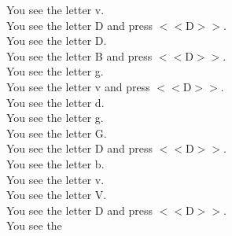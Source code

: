 \documentclass[pdflatex,sn-nature]{sn-jnl}%
\theoremstyle{thmstyleone}%
\theoremstyle{thmstyletwo}%
\theoremstyle{thmstylethree}%
\begin{document}
You see the letter v. $~$\\ 
You see the letter D and press $<<$D$>>$. $~$\\ 
You see the letter D. $~$\\ 
You see the letter B and press $<<$D$>>$. $~$\\ 
You see the letter g. $~$\\ 
You see the letter v and press $<<$D$>>$. $~$\\ 
You see the letter d. $~$\\ 
You see the letter g. $~$\\ 
You see the letter G. $~$\\ 
You see the letter D and press $<<$D$>>$. $~$\\ 
You see the letter b. $~$\\ 
You see the letter v. $~$\\ 
You see the letter V. $~$\\ 
You see the letter D and press $<<$D$>>$. $~$\\ 
You see the  
\end{document}
